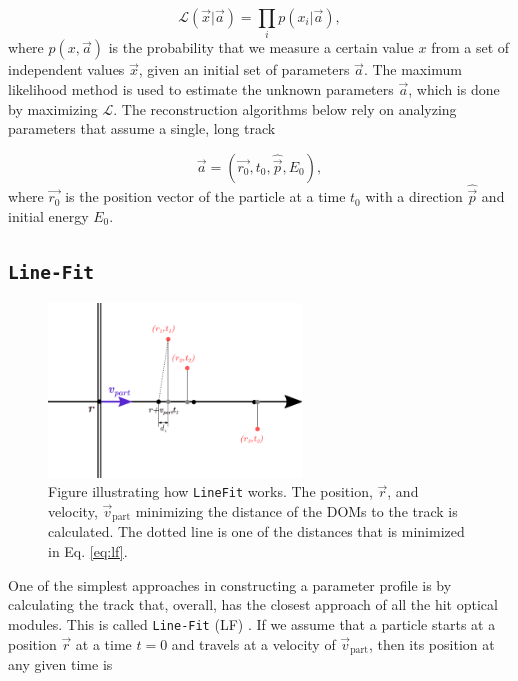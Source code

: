 \begin{equation}
\mathcal{L}(\vec{x}|\vec{a}) = \prod_i p(x_i|\vec{a}),
\end{equation}
\noindent where $p(x,\vec{a})$ is the probability that we measure a certain value $x$ from a set of independent values $\vec{x}$, given an initial set of parameters $\vec{a}$. The maximum likelihood method is used to estimate the unknown parameters $\vec{a}$, which is done by maximizing $\mathcal{L}$. The reconstruction algorithms below rely on analyzing parameters that assume a single, long track

\begin{equation}
\label{eq:vec}
\vec{a} = (\vec{r_0},t_0,\hat{\vec{p}},E_0),
\end{equation}
\noindent where $\vec{r_0}$ is the position vector of the particle at a time $t_0$ with a direction $\hat{\vec{p}}$ and initial energy $E_0$. 

\subsection{\texttt{Line-Fit}}
\label{subsec:lf}

\begin{figure}
\centering
\includegraphics[width=0.6\textwidth]{chapter7/img/linefit2.png}
\caption{Figure illustrating how \texttt{LineFit} works. The position, $\vec{r}$, and velocity, $\vec{v}_\textrm{part}$ minimizing the distance of the DOMs to the track is calculated. The dotted line is one of the distances that is minimized in Eq. \ref{eq:lf}.}
\label{fig:lf}
\end{figure}

\noindent One of the simplest approaches in constructing a parameter profile is by calculating the track that, overall, has the closest approach of all the hit optical modules. This is called \texttt{Line-Fit} (LF) \cite{Ahrens:2003fg}. If we assume that a particle starts at a position $\vec{r}$ at a time $t=0$ and travels at a velocity of $\vec{v}_\textrm{part}$, then its position at any given time is

